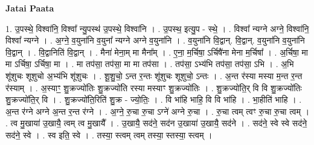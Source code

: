 \documentclass[17pt]{extarticle}
\begin{document}
\textbf{Jatai Paata} \newline

1. उ॒पस्थे॒ विश्वा॑नि॒ विश्वा᳚ न्यु॒पस्थ॑ उ॒पस्थे॒ विश्वा॑नि । . उ॒पस्थ॒ इत्यु॒प - स्थे॒ । . विश्वा᳚ न्यग्ने अग्ने॒ विश्वा॑नि॒ विश्वा᳚ न्यग्ने । . अ॒ग्ने॒ व॒युना॑नि व॒युना᳚ न्यग्ने अग्ने व॒युना॑नि । . व॒युना॑नि वि॒द्वान्. वि॒द्वान्. व॒युना॑नि व॒युना॑नि वि॒द्वान् । . वि॒द्वानिति॑ वि॒द्वान् । . मैना॑ मेना॒म् मा मैना᳚म् । . ए॒ना॒ म॒र्चिषा॒ ऽर्चिषै॑ना मेना म॒र्चिषा᳚ । . अ॒र्चिषा॒ मा मा ऽर्चिषा॒ ऽर्चिषा॒ मा । . मा तप॑सा॒ तप॑सा॒ मा मा तप॑सा । . तप॑सा॒ ऽभ्य॑भि तप॑सा॒ तप॑सा॒ ऽभि । . अ॒भि शू॑शुचः शूशुचो अ॒भ्य॑भि शू॑शुचः । . शू॒शु॒चो॒ ऽन्त र॒न्तः शू॑शुचः शूशुचो॒ ऽन्तः । . अ॒न्त र॑स्या मस्या म॒न्त र॒न्त र॑स्याम् । . अ॒स्याꣳ॒॒ शु॒क्रज्यो॑तिः शु॒क्रज्यो॑ति रस्या मस्याꣳ शु॒क्रज्यो॑तिः । . शु॒क्रज्यो॑ति॒र् वि वि शु॒क्रज्यो॑तिः शु॒क्रज्यो॑ति॒र् वि । . शु॒क्रज्यो॑ति॒रिति॑ शु॒क्र - ज्यो॒तिः॒ । . वि भा॑हि भाहि॒ वि वि भा॑हि । . भा॒हीति॑ भाहि । . अ॒न्त र॑ग्ने अग्ने अ॒न्त र॒न्त र॑ग्ने । . अ॒ग्ने॒ रु॒चा रु॒चा ऽग्ने॑ अग्ने रु॒चा । . रु॒चा त्वम् त्वꣳ रु॒चा रु॒चा त्वम् । . त्व मु॒खाया॑ उ॒खायै॒ त्वम् त्व मु॒खायै᳚ । . उ॒खायै॒ सद॑ने॒ सद॑न उ॒खाया॑ उ॒खायै॒ सद॑ने । . सद॑ने॒ स्वे स्वे सद॑ने॒ सद॑ने॒ स्वे । . स्व इति॒ स्वे । . तस्या॒ स्त्वम् त्वम् तस्या॒ स्तस्या॒ स्त्वम् । \newline
\end{document}

